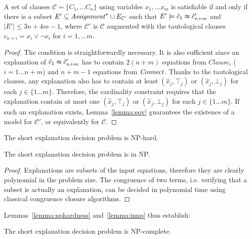\documentclass[a4paper,11pt]{article}
\begin{document}
\begin{lemma}
A set of clauses $\mathcal{C}= \{C_1, \dots C_n\}$ using variables $x_1,\dots
x_m$ is satisfiable if and only if there is a subset $E' \subseteq
{\it Assignment}^\star \cup E_{\mathcal{C}'}$ such that $E'\models \hat{c}_1
\thickapprox \hat{c}'_{n+m}$ and $|E'| \leq 3n+4m-1$, where $\mathcal{C}'$ is
$\mathcal{C}$ augmented with the tautological clauses $c_{n+i} = x_i \vee \neg
x_i$ for $i=1,\dots m$.
\end{lemma}
\begin{proof}
The condition is straightforwardly necessary.  It is also sufficient since an
explanation of $\hat{c}_1 \thickapprox \hat{c}'_{n+m}$ has to contain $2(n + m)$
equations from $Clause_i$ ($i= 1\dots n + m$) and $n + m - 1$ equations from
${\it Connect}$.  Thanks to the tautological clauses, any explanation also has to
contain at least $(\hat{x}_j,\top_j)$ or $(\hat{x}_j,\bot_j)$ for each
$j\in\{1\dots m\}$. Therefore, the cardinality constraint requires that the explanation
contain at most one $(\hat{x}_j,\top_j)$ or $(\hat{x}_j,\bot_j)$ for each
$j\in\{1\dots m\}$.  If such an explanation exists, Lemma~\ref{lemma:eqv}
guarantees the existence of a model for $\mathcal{C'}$, or equivalently for
$\mathcal{C}$.
\end{proof}




\begin{corollary}[NP-hardness]
\label{lemma:nphardness}
The short explanation decision problem is NP-hard.
\end{corollary}

\begin{lemma}[NP]
\label{lemma:innp}
The short explanation decision problem is in NP.
\end{lemma}
\begin{proof}
Explanations are subsets of the input equations, therefore they are clearly
polynomial in the problem size.  The congruence of two terms, i.e. verifying
that a subset is actually an explanation, can be decided in polynomial
time using classical congruence closure algorithms.
\end{proof}

Lemmas~\ref{lemma:nphardness} and~\ref{lemma:innp} thus establish:

\begin{theorem}[NP-completeness]
The short explanation decision problem is NP-complete.
\end{theorem}
\end{document}

